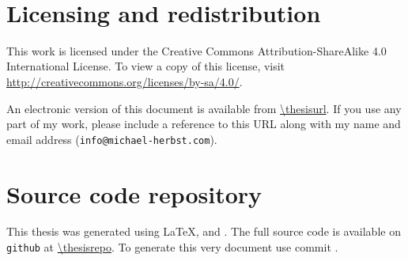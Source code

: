 \newpage
\thispagestyle{plain}
\
\vfill
\section*{Licensing and redistribution}

This work is licensed under the Creative Commons Attribution-ShareAlike 4.0
International License.
To view a copy of this license,
visit \url{http://creativecommons.org/licenses/by-sa/4.0/}.
\begin{center}
\end{center}
An electronic version of this document is available from
\url{\thesisurl}.
If you use any part of my work,
please include a reference to this URL along with my name and email address
(\texttt{info@michael-herbst.com}).

\section*{Source code repository}
This thesis was generated using \LaTeX, \python and \molsturm.
The full source code is available
on \texttt{github} at \url{\thesisrepo}.
To generate this very document use commit \texttt{\gitcommit}.
